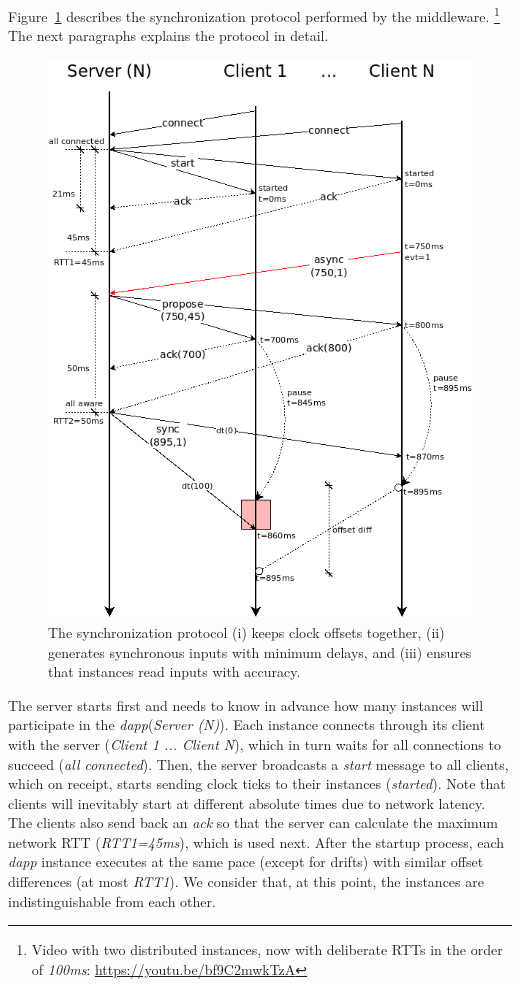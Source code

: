 \documentclass[sigplan,screen]{acmart}
\newcommand{\dapp}{\emph{dapp}\xspace}
\begin{document}
Figure~\ref{fig.protocol} describes the synchronization protocol performed by
the middleware.%
\footnote {
    Video with two distributed instances, now with deliberate RTTs in the order
    of \emph{100ms}: \url{https://youtu.be/bf9C2mwkTzA}
}
The next paragraphs explains the protocol in detail.

\begin{figure}[t]
  \centering
  \includegraphics[width=\linewidth]{protocol}
  \caption{
    \label{fig.protocol}
    The synchronization protocol
        (i) keeps clock offsets together,
        (ii) generates synchronous inputs with minimum delays, and
        (iii) ensures that instances read inputs with accuracy.
  }
\end{figure}

The server starts first and needs to know in advance how many instances will
participate in the \dapp (\emph{Server (N)}).
Each instance connects through its client with the server
(\emph{Client 1 ... Client N}), which in turn waits for all connections to
succeed (\emph{all connected}).
Then, the server broadcasts a \emph{start} message to all clients, which on
receipt, starts sending clock ticks to their instances (\emph{started}).
Note that clients will inevitably start at different absolute times due to
network latency.
The clients also send back an \emph{ack} so that the server can calculate the
maximum network RTT (\emph{RTT1=45ms}), which is used next.
%
After the startup process, each \dapp instance executes at the same pace
(except for drifts) with similar offset differences (at most \emph{RTT1}).
We consider that, at this point, the instances are indistinguishable from each
other.
\end{document}
